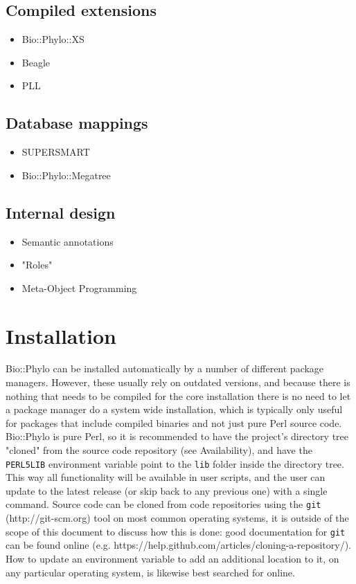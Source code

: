 \documentclass{bioinfo}
\begin{document}
\subsection{Compiled extensions}

\begin{itemize}
\item Bio::Phylo::XS
\item Beagle
\item PLL
\end{itemize}

\subsection{Database mappings}

\begin{itemize}
\item SUPERSMART
\item Bio::Phylo::Megatree
\end{itemize}

\subsection{Internal design}

\begin{itemize}
\item Semantic annotations
\item "Roles"
\item Meta-Object Programming
\end{itemize}

\section{Installation}

Bio::Phylo can be installed automatically by a number of different package managers. 
However, these usually rely on outdated versions, and because there is nothing that needs 
to be compiled for the core installation there is no need to let a package manager do a 
system wide installation, which is typically only useful for packages that include 
compiled binaries and not just pure Perl source code. Bio::Phylo is pure Perl, so it is 
recommended to have the project's directory tree "cloned" from the source code repository 
(see Availability), and have the \texttt{PERL5LIB} environment variable point to the 
\texttt{lib} folder inside the directory tree. This way all functionality will be 
available in user scripts, and the user can update to the latest release (or skip back to 
any previous one) with a single command. Source code can be cloned from code repositories
using the \texttt{git} (http://git-scm.org) tool on most common operating systems, it is 
outside of the scope of this document to discuss how this is done: good documentation for 
\texttt{git} can be found online (e.g. 
https://help.github.com/articles/cloning-a-repository/). How to update an environment 
variable to add an additional location to it, on any particular operating system, is 
likewise best searched for online.
\end{document}
